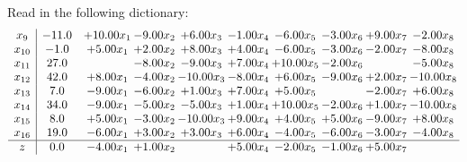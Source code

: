 \documentclass[9pt]{article}
\begin{document}
Read in the following dictionary:
\[\begin{array}{c| c c@{\hskip 2pt} c@{\hskip 2pt} c@{\hskip 2pt} c@{\hskip 2pt} c@{\hskip 2pt} c@{\hskip 2pt} c@{\hskip 2pt} c@{\hskip 2pt} }
 x_{9}   &  -11.0 & + 10.00 x_{1} & -9.00 x_{2} & +  6.00 x_{3} & -1.00 x_{4} & -6.00 x_{5} & -3.00 x_{6} & +  9.00 x_{7} & -2.00 x_{8}\\
 x_{10}   &  -1.0 & +  5.00 x_{1} & +  2.00 x_{2} & +  8.00 x_{3} & +  4.00 x_{4} & -6.00 x_{5} & -3.00 x_{6} & -2.00 x_{7} & -8.00 x_{8}\\
 x_{11}   &  27.0  &   & -8.00 x_{2} & -9.00 x_{3} & +  7.00 x_{4} & + 10.00 x_{5} & -2.00 x_{6} &   & -5.00 x_{8}\\
 x_{12}   &  42.0 & +  8.00 x_{1} & -4.00 x_{2} & -10.00 x_{3} & -8.00 x_{4} & +  6.00 x_{5} & -9.00 x_{6} & +  2.00 x_{7} & -10.00 x_{8}\\
 x_{13}   &  7.0 & -9.00 x_{1} & -6.00 x_{2} & +  1.00 x_{3} & +  7.00 x_{4} & +  5.00 x_{5} &   & -2.00 x_{7} & +  6.00 x_{8}\\
 x_{14}   &  34.0 & -9.00 x_{1} & -5.00 x_{2} & -5.00 x_{3} & +  1.00 x_{4} & + 10.00 x_{5} & -2.00 x_{6} & +  1.00 x_{7} & -10.00 x_{8}\\
 x_{15}   &  8.0 & +  5.00 x_{1} & -3.00 x_{2} & -10.00 x_{3} & +  9.00 x_{4} & +  4.00 x_{5} & +  5.00 x_{6} & -9.00 x_{7} & +  8.00 x_{8}\\
 x_{16}   &  19.0 & -6.00 x_{1} & +  3.00 x_{2} & +  3.00 x_{3} & +  6.00 x_{4} & -4.00 x_{5} & -6.00 x_{6} & -3.00 x_{7} & -4.00 x_{8}\\
\hline
z    &  0.0 & -4.00 x_{1} & +  1.00 x_{2} &   & +  5.00 x_{4} & -2.00 x_{5} & -1.00 x_{6} & +  5.00 x_{7} &   \\
\end{array}\]
\end{document}
